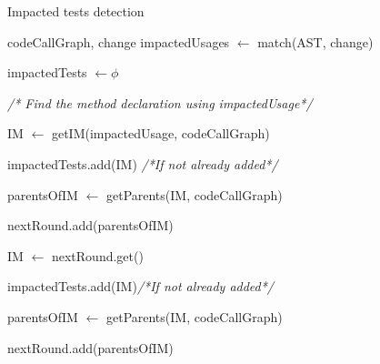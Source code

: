\begin{algorithm}
\caption{Impacted tests detection}\label{algo :impactedTestsDetection}
\begin{algorithmic}[1]


\Require codeCallGraph, change
\State impactedUsages $\leftarrow$ match(AST, change)

\State impactedTests $\leftarrow \phi$ 
    
\State \emph{\textcolor{circlegreen}{ \footnotesize{/* Find the method declaration using impactedUsage*/}}}
            
\State IM $\leftarrow$ getIM(impactedUsage, codeCallGraph) 	       
                
             \State   impactedTests.add(IM) 	\emph{\textcolor{circlegreen}{/*If not already added*/}}
    
  \Else
            
             \State parentsOfIM $\leftarrow$ getParents(IM, codeCallGraph)
              
            \State  nextRound.add(parentsOfIM)
                        
                    
                    \State    IM $\leftarrow$ nextRound.get()
                        
                        
                            
                             \State  impactedTests.add(IM)\emph{\textcolor{circlegreen}{/*If not already added*/}}
                            
                            \Else 
                            
                            \State  parentsOfIM $\leftarrow$ getParents(IM, codeCallGraph)
                             
                           \State   nextRound.add(parentsOfIM) 
                            \EndIf


                        
                    
            \EndWhile
            \EndIf
\EndFor
\end{algorithmic}
\end{algorithm}


